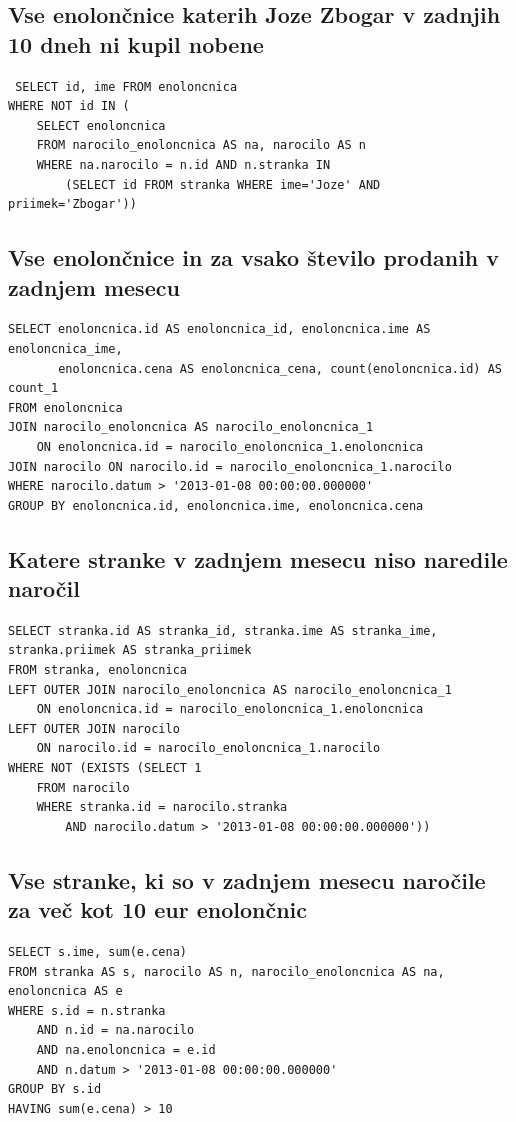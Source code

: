 \documentclass[12pt]{article}
\begin{document}
\subsection{Vse enolončnice katerih Joze Zbogar v zadnjih 10 dneh ni kupil nobene}

\begin{verbatim}
 SELECT id, ime FROM enoloncnica
WHERE NOT id IN (
    SELECT enoloncnica
    FROM narocilo_enoloncnica AS na, narocilo AS n
    WHERE na.narocilo = n.id AND n.stranka IN
        (SELECT id FROM stranka WHERE ime='Joze' AND priimek='Zbogar'))
\end{verbatim}
    
\subsection{Vse enolončnice in za vsako število prodanih v zadnjem mesecu}

\begin{verbatim}
SELECT enoloncnica.id AS enoloncnica_id, enoloncnica.ime AS enoloncnica_ime,
       enoloncnica.cena AS enoloncnica_cena, count(enoloncnica.id) AS count_1 
FROM enoloncnica
JOIN narocilo_enoloncnica AS narocilo_enoloncnica_1
    ON enoloncnica.id = narocilo_enoloncnica_1.enoloncnica
JOIN narocilo ON narocilo.id = narocilo_enoloncnica_1.narocilo 
WHERE narocilo.datum > '2013-01-08 00:00:00.000000'
GROUP BY enoloncnica.id, enoloncnica.ime, enoloncnica.cena
\end{verbatim}

\subsection{Katere stranke v zadnjem mesecu niso naredile naročil}

\begin{verbatim}
SELECT stranka.id AS stranka_id, stranka.ime AS stranka_ime, stranka.priimek AS stranka_priimek 
FROM stranka, enoloncnica
LEFT OUTER JOIN narocilo_enoloncnica AS narocilo_enoloncnica_1
    ON enoloncnica.id = narocilo_enoloncnica_1.enoloncnica
LEFT OUTER JOIN narocilo
    ON narocilo.id = narocilo_enoloncnica_1.narocilo 
WHERE NOT (EXISTS (SELECT 1 
    FROM narocilo 
    WHERE stranka.id = narocilo.stranka
        AND narocilo.datum > '2013-01-08 00:00:00.000000'))
\end{verbatim}

\subsection{Vse stranke, ki so v zadnjem mesecu naročile za več kot 10 eur enolončnic}

\begin{verbatim}
SELECT s.ime, sum(e.cena)
FROM stranka AS s, narocilo AS n, narocilo_enoloncnica AS na, enoloncnica AS e
WHERE s.id = n.stranka
    AND n.id = na.narocilo
    AND na.enoloncnica = e.id
    AND n.datum > '2013-01-08 00:00:00.000000'
GROUP BY s.id
HAVING sum(e.cena) > 10
\end{verbatim}
    
\end{document}
